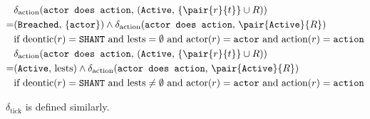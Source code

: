 \documentclass{article}
\begin{document}
\begin{align*}
  & \delta_\text{action}(
    \texttt{actor does action}, \,
    (
      \texttt{Active}, \,
      \{\pair{r}{t}\} \cup R
    )
  )
  \\
  = &
  (
    \texttt{Breached}, \,
    \{\texttt{actor}\}
  )
  \wedge
  \delta_\text{action}(\texttt{actor does action}, \, \pair{\texttt{Active}}{R})
  \\
  & \text{if deontic}(r) = \texttt{SHANT} \text{ and lests} = \emptyset
  \text{ and } \text{actor}(r) = \texttt{actor}
  \text{ and } \text{action}(r) = \texttt{action}
  \\
  & \delta_\text{action}(
    \texttt{actor does action}, \,
    (
      \texttt{Active}, \,
      \{\pair{r}{t}\} \cup R
    )
  )
  \\
  = &
  (
    \texttt{Active}, \,
    \text{lests}
  )
  \wedge
  \delta_\text{action}(\texttt{actor does action}, \, \pair{\texttt{Active}}{R})
  \\
  & \text{if deontic}(r) = \texttt{SHANT} \text{ and lests} \neq \emptyset
  \text{ and } \text{actor}(r) = \texttt{actor}
  \text{ and } \text{action}(r) = \texttt{action}
\end{align*}


$\delta_\text{tick}$ is defined similarly.




\end{document}
